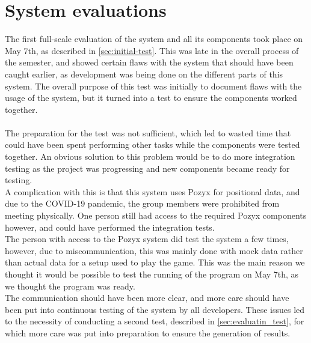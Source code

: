 \section{System evaluations}\label{discussevaluations}
The first full-scale evaluation of the system and all its components took place on May 7th, as described in \autoref{sec:initial-test}.
This was late in the overall process of the semester, and showed certain flaws with the system that should have been caught earlier, as development was being done on the different parts of this system.
The overall purpose of this test was initially to document flaws with the usage of the system, but it turned into a test to ensure the components worked together.
\\\\
The preparation for the test was not sufficient, which led to wasted time that could have been spent performing other tasks while the components were tested together.
An obvious solution to this problem would be to do more integration testing as the project was progressing and new components became ready for testing.\\
A complication with this is that this system uses Pozyx for positional data, and due to the COVID-19 pandemic, the group members were prohibited from meeting physically.
One person still had access to the required Pozyx components however, and could have performed the integration tests.\\
The person with access to the Pozyx system did test the system a few times, however, due to miscommunication, this was mainly done with mock data rather than actual data for a setup used to play the game.
This was the main reason we thought it would be possible to test the running of the program on May 7th, as we thought the program was ready.\\
The communication should have been more clear, and more care should have been put into continuous testing of the system by all developers.
These issues led to the necessity of conducting a second test, described in \autoref{sec:evaluatin_test}, for which more care was put into preparation to ensure the generation of results.